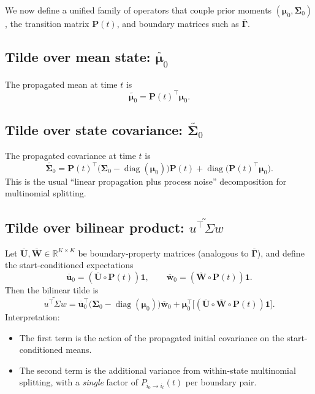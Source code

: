 \documentclass[11pt]{article}
\begin{document}
We now define a unified family of operators that couple prior moments \((\boldsymbol{\mu}_0,\boldsymbol{\Sigma}_0)\), the transition matrix \(\mathbf{P}(t)\), and boundary matrices such as \(\overline{\mathbf{\Gamma}}\).

\subsection{Tilde over mean state: \texorpdfstring{\(\widetilde{\boldsymbol{\mu}_0}\)}{mu-tilde}}

The propagated mean at time \(t\) is
\[
  \boxed{
    \widetilde{\boldsymbol{\mu}_0}
    =
    \mathbf{P}(t)^\top \boldsymbol{\mu}_0
  }.
\]

\subsection{Tilde over state covariance: \texorpdfstring{\(\widetilde{\boldsymbol{\Sigma}_0}\)}{Sigma-tilde}}

The propagated covariance at time \(t\) is
\[
  \boxed{
    \widetilde{\boldsymbol{\Sigma}_0}
    =
    \mathbf{P}(t)^\top
    \bigl(\boldsymbol{\Sigma}_0-\operatorname{diag}(\boldsymbol{\mu}_0)\bigr)
    \mathbf{P}(t)
    +
    \operatorname{diag}\bigl(\mathbf{P}(t)^\top\boldsymbol{\mu}_0\bigr)
  }.
\]
This is the usual ``linear propagation plus process noise'' decomposition for multinomial splitting.

\subsection{Tilde over bilinear product:
\texorpdfstring{\(\widetilde{u^\top \Sigma w}\)}{uTSigmaw-tilde}}

Let \(\overline{\mathbf{U}}, \overline{\mathbf{W}}\in\mathbb{R}^{K\times K}\) be boundary-property matrices (analogous to \(\overline{\mathbf{\Gamma}}\)), and define the start-conditioned expectations
\[
  \overline{\boldsymbol{u}}_0
  =
  (\overline{\mathbf{U}}\circ\mathbf{P}(t))\mathbf{1},
  \qquad
  \overline{\boldsymbol{w}}_0
  =
  (\overline{\mathbf{W}}\circ\mathbf{P}(t))\mathbf{1}.
\]
Then the bilinear tilde is
\[
  \boxed{
    \widetilde{u^\top\Sigma w}
    =
    \overline{\boldsymbol{u}}_0^\top
    \bigl(\boldsymbol{\Sigma}_0-\operatorname{diag}(\boldsymbol{\mu}_0)\bigr)
    \overline{\boldsymbol{w}}_0
    +
    \boldsymbol{\mu}_0^\top
    \bigl[(\overline{\mathbf{U}}\circ\overline{\mathbf{W}}\circ\mathbf{P}(t))\mathbf{1}\bigr]
  }.
\]
Interpretation:
\begin{itemize}
  \item The first term is the action of the propagated initial covariance on the start-conditioned means.
  \item The second term is the additional variance from within-state multinomial splitting, with a \emph{single} factor of \(P_{i_0\to i_t}(t)\) per boundary pair.
\end{itemize}
\end{document}
